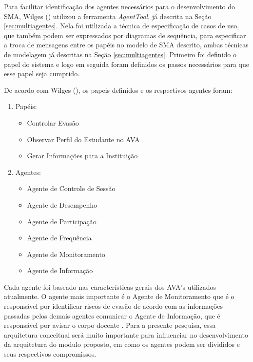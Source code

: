 Para facilitar identificação dos agentes necessários para o desenvolvimento do SMA, Wilges (\citeyear{wilges2010sistemas}) utilizou a ferramenta \textit{AgentTool}, já descrita na Seção \ref{sec:multiagentes}. Nela foi utilizada a técnica de especificação de casos de uso, que também podem ser expressados por diagramas de sequência, para especificar a troca de mensagens entre os papéis no modelo de SMA descrito, ambas técnicas de modelagem já descritas na Seção \ref{sec:multiagentes}. Primeiro foi definido o papel do sistema e logo em seguida foram definidos os passos necessários para que esse papel seja cumprido.

De acordo com Wilges (\citeyear{wilges2010sistemas}), os papeis definidos e os respectivos agentes foram:

\begin{enumerate}
\item Papéis:
\begin{itemize}
\item Controlar Evasão
\item Observar Perfil do Estudante no AVA
\item Gerar Informações para a Instituição
\end{itemize}
\item Agentes:
\begin{itemize}
\item Agente de Controle de Sessão
\item Agente de Desempenho
\item Agente de Participação
\item Agente de Frequência
\item Agente de Monitoramento
\item Agente de Informação
\end{itemize}
\end{enumerate}

Cada agente foi baseado nas características gerais dos AVA’s utilizados atualmente. O agente mais importante é o Agente de Monitoramento que é o responsável por identificar riscos de evasão de acordo com as informações passadas pelos demais agentes comunicar o Agente de Informação, que é responsável por avisar o corpo docente \cite{wilges2010sistemas}. Para a presente pesquisa, essa arquitetura conceitual será muito importante para influenciar no desenvolvimento da arquitetura do modulo proposto, em como os agentes podem ser divididos e seus respectivos compromissos.

\label{sec:silva}

